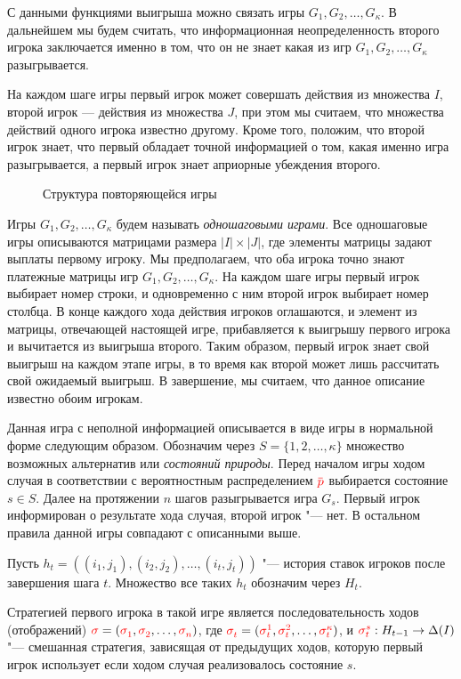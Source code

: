 {С данными функциями выигрыша можно связать игры $G_1, G_2, \ldots, G_\kappa$.
В дальнейшем мы будем считать, что информационная неопределенность второго игрока заключается именно в том, что он не знает какая из игр $G_1, G_2, \ldots, G_\kappa$ разыгрывается.

На каждом шаге игры первый игрок может совершать действия из множества $I$, второй игрок --- действия из множества $J$, при этом мы считаем, что множества действий одного игрока известно другому.
Кроме того, положим, что второй игрок знает, что первый обладает точной информацией о том, какая именно игра разыгрывается, а первый игрок знает априорные убеждения второго.

\begin{figure}[t]
  \centering
  
  \caption{Структура повторяющейся игры}
  \label{ch1:fig:game_structure}
\end{figure}

Игры $G_1, G_2, \ldots, G_\kappa$ будем называть \emph{одношаговыми играми}.
Все одношаговые игры описываются матрицами размера $|I| \times |J|$, где элементы матрицы задают выплаты первому игроку.
Мы предполагаем, что оба игрока точно знают платежные матрицы игр $G_1, G_2, \ldots, G_\kappa$.
На каждом шаге игры первый игрок выбирает номер строки, и одновременно с ним второй игрок выбирает номер столбца.
В конце каждого хода действия игроков оглашаются, и элемент из матрицы, отвечающей настоящей игре, прибавляется к выигрышу первого игрока и вычитается из выигрыша второго.
Таким образом, первый игрок знает свой выигрыш на каждом этапе игры, в то время как второй может лишь рассчитать свой ожидаемый выигрыш.
В завершение, мы считаем, что данное описание известно обоим игрокам.

Данная игра с неполной информацией описывается в виде игры в нормальной форме следующим образом.
Обозначим через $S = \{1, 2, \ldots, \kappa\}$ множество возможных альтернатив или \emph{состояний природы}.
Перед началом игры ходом случая в соответствии с вероятностным распределением $\pd$ выбирается состояние $s \in S$.
Далее на протяжении $n$ шагов разыгрывается игра $G_s$.
Первый игрок информирован о результате хода случая, второй игрок "--- нет.
В остальном правила данной игры совпадают с описанными выше.

Пусть $h_t = \left((i_1, j_1), (i_2, j_2), \ldots, (i_t, j_t)\right)$ "--- история ставок игроков после завершения шага $t$.
Множество все таких $h_t$ обозначим через $H_t$. 

Стратегией первого игрока в такой игре является последовательность ходов (отображений) $\sigmar = (\sigmas{1}, \sigmas{2}, \ldots, \sigmas{n})$, где $\sigmas{t} = (\sigmas[1]{t}, \sigmas[2]{t}, \ldots, \sigmas[\kappa]{t})$, и $\sigmas[s]{t}: H_{t-1} \rightarrow \Delta(I)$ "--- смешанная стратегия, зависящая от предыдущих ходов, которую первый игрок использует если ходом случая реализовалось состояние $s$.

}
